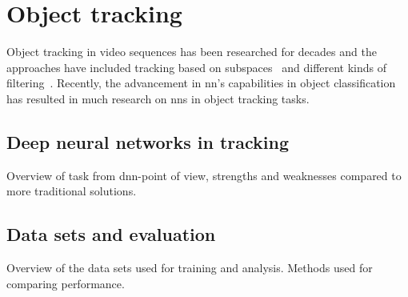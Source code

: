 \section{Object tracking}
Object tracking in video sequences has been researched for decades and the approaches
have included tracking based on subspaces~\cite{EIGENTRACK} and different kinds of
filtering~\cite{CONDENSATION}. Recently, the advancement in \ac{nn}'s capabilities in
object classification has resulted in much research on \ac{nn}s in object tracking
tasks.~\cite{OT_BENCH}

\subsection{Deep neural networks in tracking}
Overview of task from \ac{dnn}-point of view, strengths and weaknesses compared to
more traditional solutions.

\subsection{Data sets and evaluation}
Overview of the data sets used for training and analysis. Methods used for comparing
performance.

